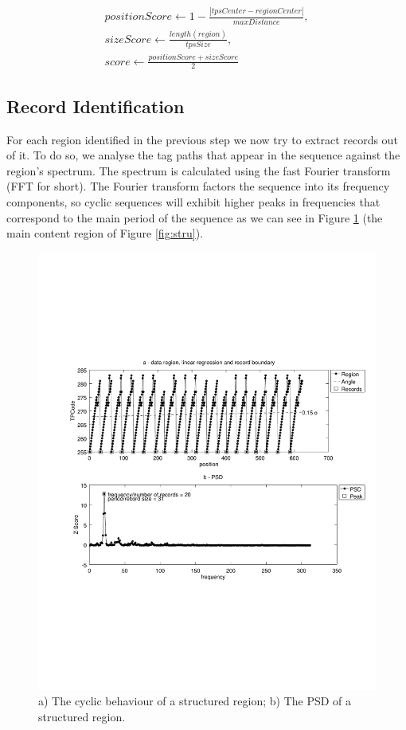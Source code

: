 \documentclass{vldb}
\begin{document}
\begin{equation}\label{eq:scorereg}
\begin{split}
positionScore \leftarrow 1-\frac{|tpsCenter - regionCenter|}{maxDistance}, \\
sizeScore \leftarrow \frac{length(region)}{tpsSize},\\
score \leftarrow \frac{positionScore+sizeScore}{2}
\end{split}
\end{equation}

\subsection{Record Identification}\label{ss:reci}

For each region identified in the previous step we now try to extract records
out of it. To do so, we analyse the tag paths that appear in the sequence
against the region's spectrum. The spectrum is calculated using the fast Fourier
transform\cite{fft1965} (FFT for short). The Fourier transform factors the
sequence into its frequency components, so cyclic sequences will exhibit higher
peaks in frequencies that correspond to the main period of the sequence as we
can see in Figure \ref{fig:fftreg} (the main content region of Figure
\ref{fig:stru}).

\begin{figure}[h]
  \centering
     \includegraphics[trim={2.5cm 7.5cm 1cm 6.5cm}, width=\linewidth
     ]{img/fftreg.pdf}
  \caption{a) The cyclic behaviour of a structured region; b) The PSD of a
  structured region.}
  \label{fig:fftreg}
\end{figure}
\end{document}
